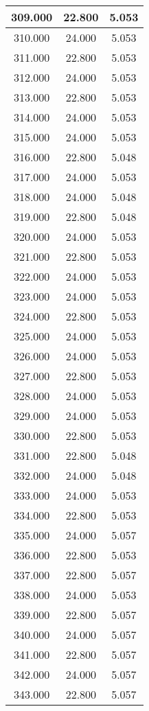 \documentclass[11pt,a4paper]{jsarticle}
\begin{document}
\begin{center}
\begin{longtable}{|c|c|c|}
309.000	 & 22.800&  5.053 \\ \hline
310.000	 & 24.000&  5.053 \\ \hline
311.000	 & 22.800&  5.053 \\ \hline
312.000	 & 24.000&  5.053 \\ \hline
313.000	 & 22.800&  5.053 \\ \hline
314.000	 & 24.000&  5.053 \\ \hline
315.000	 & 24.000&  5.053 \\ \hline
316.000	 & 22.800&  5.048 \\ \hline
317.000	 & 24.000&  5.053 \\ \hline
318.000	 & 24.000&  5.048 \\ \hline
319.000	 & 22.800&  5.048 \\ \hline
320.000	 & 24.000&  5.053 \\ \hline
321.000	 & 22.800&  5.053 \\ \hline
322.000	 & 24.000&  5.053 \\ \hline
323.000	 & 24.000&  5.053 \\ \hline
324.000	 & 22.800&  5.053 \\ \hline
325.000	 & 24.000&  5.053 \\ \hline
326.000	 & 24.000&  5.053 \\ \hline
327.000	 & 22.800&  5.053 \\ \hline
328.000	 & 24.000&  5.053 \\ \hline
329.000	 & 24.000&  5.053 \\ \hline
330.000	 & 22.800&  5.053 \\ \hline
331.000	 & 22.800&  5.048 \\ \hline
332.000	 & 24.000&  5.048 \\ \hline
333.000	 & 24.000&  5.053 \\ \hline
334.000	 & 22.800&  5.053 \\ \hline
335.000	 & 24.000&  5.057 \\ \hline
336.000	 & 22.800&  5.053 \\ \hline
337.000	 & 22.800&  5.057 \\ \hline
338.000	 & 24.000&  5.053 \\ \hline
339.000	 & 22.800&  5.057 \\ \hline
340.000	 & 24.000&  5.057 \\ \hline
341.000	 & 22.800&  5.057 \\ \hline
342.000	 & 24.000&  5.057 \\ \hline
343.000	 & 22.800&  5.057 \\ \hline

\end{longtable}
\end{center}
\end{document}
